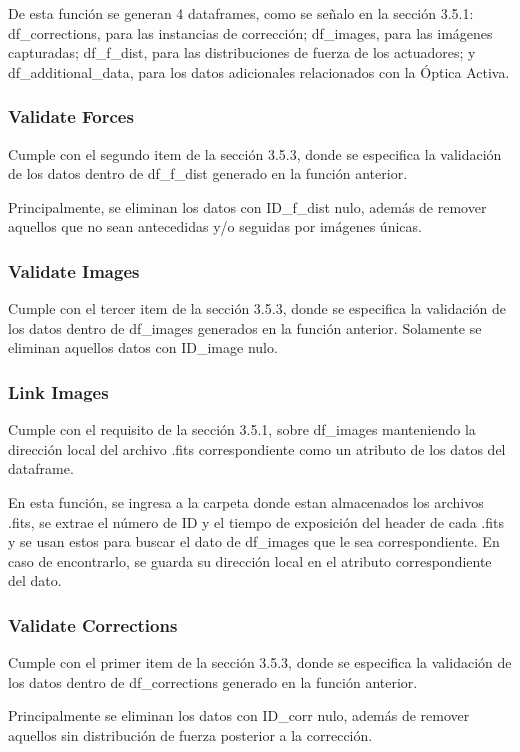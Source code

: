 De esta función se generan 4 dataframes, como se señalo en la sección 3.5.1: df\_corrections, para las instancias de corrección; df\_images, para las imágenes capturadas; df\_f\_dist, para las distribuciones de fuerza de los actuadores; y df\_additional\_data, para los datos adicionales relacionados con la Óptica Activa.

\subsubsection{Validate Forces} 
Cumple con el segundo item de la sección 3.5.3, donde se especifica la validación de los datos dentro de df\_f\_dist generado en la función anterior. 

Principalmente, se eliminan los datos con ID\_f\_dist nulo, además de remover aquellos que no sean antecedidas y/o seguidas por imágenes únicas.

\subsubsection{Validate Images} 
Cumple con el tercer item de la sección 3.5.3, donde se especifica la validación de los datos dentro de df\_images generados en la función anterior. Solamente se eliminan aquellos datos con ID\_image nulo.

\subsubsection{Link Images} 
Cumple con el requisito de la sección 3.5.1, sobre df\_images manteniendo la dirección local del archivo .fits correspondiente como un atributo de los datos del dataframe.

En esta función, se ingresa a la carpeta donde estan almacenados los archivos .fits, se extrae el número de ID y el tiempo de exposición del header de cada .fits y se usan estos para buscar el dato de df\_images que le sea correspondiente. En caso de encontrarlo, se guarda su dirección local en el atributo correspondiente del dato.

\subsubsection{Validate Corrections} 
Cumple con el primer item de la sección 3.5.3, donde se especifica la validación de los datos dentro de df\_corrections generado en la función anterior.

Principalmente se eliminan los datos con ID\_corr nulo, además de remover aquellos sin distribución de fuerza posterior a la corrección.

